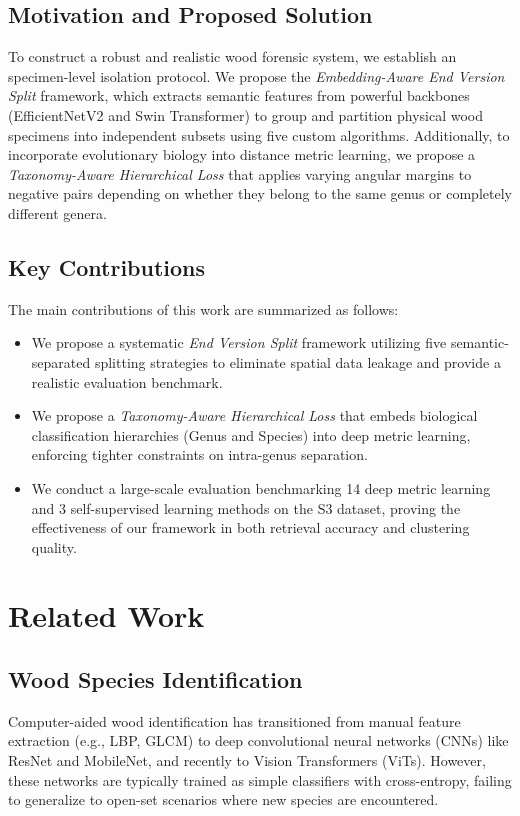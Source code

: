 \documentclass[journal,onecolumn]{IEEEtran}
\begin{document}
\subsection{Motivation and Proposed Solution}
To construct a robust and realistic wood forensic system, we establish an specimen-level isolation protocol. We propose the \textit{Embedding-Aware End Version Split} framework, which extracts semantic features from powerful backbones (EfficientNetV2 and Swin Transformer) to group and partition physical wood specimens into independent subsets using five custom algorithms. Additionally, to incorporate evolutionary biology into distance metric learning, we propose a \textit{Taxonomy-Aware Hierarchical Loss} that applies varying angular margins to negative pairs depending on whether they belong to the same genus or completely different genera.

\subsection{Key Contributions}
The main contributions of this work are summarized as follows:
\begin{itemize}
    \item We propose a systematic \textit{End Version Split} framework utilizing five semantic-separated splitting strategies to eliminate spatial data leakage and provide a realistic evaluation benchmark.
    \item We propose a \textit{Taxonomy-Aware Hierarchical Loss} that embeds biological classification hierarchies (Genus and Species) into deep metric learning, enforcing tighter constraints on intra-genus separation.
    \item We conduct a large-scale evaluation benchmarking 14 deep metric learning and 3 self-supervised learning methods on the S3 dataset, proving the effectiveness of our framework in both retrieval accuracy and clustering quality.
\end{itemize}

\section{Related Work}

\subsection{Wood Species Identification}
Computer-aided wood identification has transitioned from manual feature extraction (e.g., LBP, GLCM) to deep convolutional neural networks (CNNs) like ResNet and MobileNet, and recently to Vision Transformers (ViTs). However, these networks are typically trained as simple classifiers with cross-entropy, failing to generalize to open-set scenarios where new species are encountered.
\end{document}

